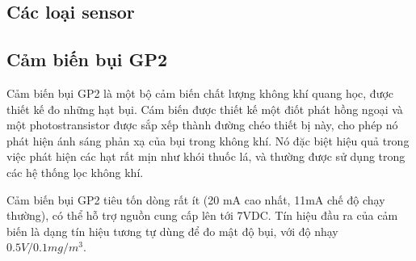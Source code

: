 \subsection{Các loại sensor}
\subsection*{Cảm biến bụi GP2} 
Cảm biến bụi GP2 là một bộ cảm biến chất lượng không khí quang học, được thiết kế đo những hạt bụi. Cám biến được thiết kế một điốt phát hồng ngoại và một photostransistor được sắp xếp thành đường chéo thiết bị này, cho phép nó phát hiện ánh sáng phản xạ của bụi trong không khí.  Nó đặc biệt hiệu quả trong việc phát hiện các hạt rất mịn như khói thuốc lá, và thường được sử dụng trong các hệ thống lọc không khí.

Cảm biến bụi GP2 tiêu tốn dòng rất ít (20 mA cao nhất, 11mA chế độ chạy thường), có thể hỗ trợ nguồn cung cấp lên tới 7VDC. Tín hiệu đầu ra của cảm biến là dạng tín hiệu tương tự dùng để đo mật độ bụi, với độ nhạy $0.5V/0.1mg/{m}^{3}$.

